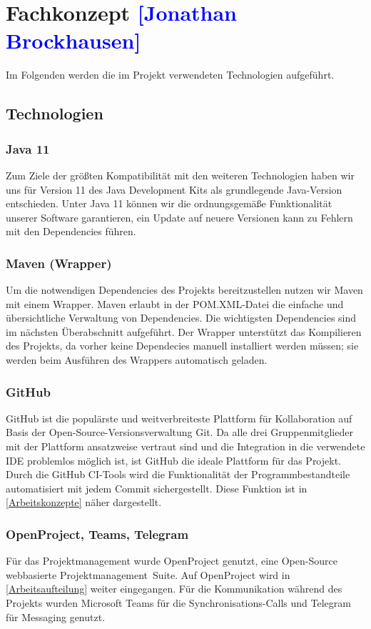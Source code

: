 

\section{Fachkonzept \textcolor{blue}{[Jonathan Brockhausen]}}
\label{Technologien}

Im Folgenden werden die im Projekt verwendeten Technologien aufgeführt.

\subsection{Technologien}

\subsubsection*{Java 11}
Zum Ziele der größten Kompatibilität mit den weiteren Technologien haben wir uns für Version 11 des Java Development Kits als grundlegende Java-Version entschieden. Unter Java 11 können wir die ordnungsgemäße Funktionalität unserer Software garantieren, ein Update auf neuere Versionen kann zu Fehlern mit den Dependencies führen.
\subsubsection*{Maven (Wrapper)}
Um die notwendigen Dependencies des Projekts bereitzustellen nutzen wir Maven mit einem Wrapper. Maven erlaubt in der POM.XML-Datei die einfache und übersichtliche Verwaltung von Dependencies. Die wichtigsten Dependencies sind im nächsten Überabschnitt aufgeführt. Der Wrapper unterstützt das Kompilieren des Projekts, da vorher keine Dependecies manuell installiert werden müssen; sie werden beim Ausführen des Wrappers automatisch geladen.
\subsubsection*{GitHub}
GitHub ist die populärste und weitverbreiteste Plattform für Kollaboration auf Basis der Open-Source-Versionsverwaltung Git. Da alle drei Gruppenmitglieder mit der Plattform ansatzweise vertraut sind und die Integration in die verwendete IDE problemlos möglich ist, ist GitHub die ideale Plattform für das Projekt. Durch die GitHub CI-Tools wird die Funktionalität der Programmbestandteile automatisiert mit jedem Commit sichergestellt. Diese Funktion ist in \cref{Arbeitskonzepte} näher dargestellt.
\subsubsection*{OpenProject, Teams, Telegram}
Für das Projektmanagement wurde OpenProject genutzt, eine Open-Source webbasierte Projektmanagement~Suite. Auf OpenProject wird in \autoref{Arbeitsaufteilung} weiter eingegangen.
Für die Kommunikation während des Projekts wurden Microsoft Teams für die Synchronisations-Calls und Telegram für Messaging genutzt.

